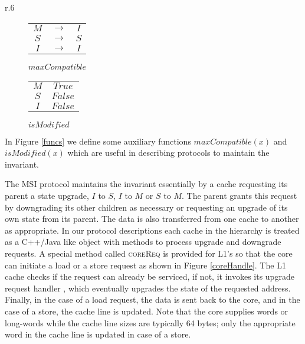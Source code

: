 \begin{wrapfigure}{r}{.6\linewidth}
\begin{subfigure}{.55\linewidth}
\centering
\begin{tabular}{|ccc|}
\hline
$M$ & $\rightarrow$ & $I$\\
$S$ & $\rightarrow$ & $S$\\
$I$ & $\rightarrow$ & $I$\\
\hline
\end{tabular}
\caption{$maxCompatible$}
\label{toCompat}
\end{subfigure}
\begin{subfigure}{.24\linewidth}
\centering
\begin{tabular}{|c|c|}
\hline
$M$ & $True$\\
$S$ & $False$\\
$I$ & $False$\\
\hline
\end{tabular}
\caption{$isModified$}
\label{isModified}
\end{subfigure}
\caption{MSI auxiliary functions ($I < S < M$)}
\label{funcs}
\end{wrapfigure}
In Figure \ref{funcs} we define some auxiliary functions $maxCompatible(x)$ and $isModified(x)$ which are useful in describing protocols to maintain the invariant.

The MSI protocol maintains the invariant essentially by a cache requesting its parent a state upgrade, \ie $I$ to $S$, $I$ to $M$ or $S$ to $M$. The parent grants this request by downgrading its other children as necessary or requesting an upgrade of its own state from its parent. The data is also transferred from one cache to another as appropriate. In our protocol descriptions each cache in the hierarchy is treated as a C++/Java like object with methods to process upgrade and downgrade requests. A special method called \textsc{coreReq} is provided for L1's so that the core can initiate a load or a store request as shown in Figure \ref{coreHandle}. The L1 cache checks if the request
can already be serviced, if not, it invokes its upgrade request handler \uReq{},
which eventually upgrades the state of the requested address. Finally, in the case 
of a load request, the data is sent back to the core, and in the case of a store, the
cache line is updated. Note that the core supplies words or long-words while the
cache line sizes are typically 64 bytes; only the appropriate word in the cache
line is updated in case of a store.



